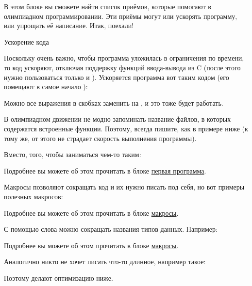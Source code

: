 \hypertarget{1.0}{}
В этом блоке вы сможете найти список приёмов, которые помогают в олимпиадном программировании. Эти приёмы могут или ускорять программу, или упрощать её написание. Итак, поехали!


\startspace
Ускорение кода
\endspace

Поскольку очень важно, чтобы программа уложилась в ограничения по времени, то код ускоряют, отключая поддержку функций ввода-вывода из C (после этого нужно пользоваться только  и ). Ускоряется программа вот таким кодом (его помещают в самое начало ):


Можно все выражения в скобках заменить на , и это тоже будет работать.


\startspace
{}
\endspace

В олимпиадном движении не модно запоминать название файлов, в которых содержатся встроенные функции. Поэтому, всегда пишите, как в примере ниже (к тому же, от этого не страдает скорость выполнения программы).


Вместо, того, чтобы заниматься чем-то таким:


Подробнее вы можете об этом прочитать в блоке \hyperlink{1.1}{первая программа}.


\startspace
{}
\endspace

Макросы позволяют сокращать код и их нужно писать под себя, но вот примеры полезных макросов:


Подробнее вы можете об этом прочитать в блоке \hyperlink{macros}{макросы}.


\startspace
{}
\endspace

С помощью слова  можно сокращать названия типов данных. Например:


Подробнее вы можете об этом прочитать в блоке \hyperlink{macros}{макросы}.


\startspace
{}
\endspace

Аналогично никто не хочет писать что-то длинное, например такое:


Поэтому делают оптимизацию ниже.


